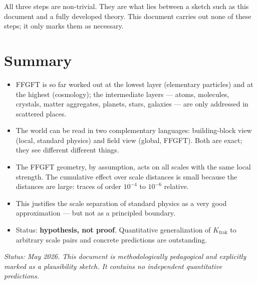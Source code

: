 All three steps are non-trivial. They are what lies between a
sketch such as this document and a fully developed theory. This
document carries out none of these steps; it only marks them as
necessary.

\section*{Summary}

\begin{itemize}\setlength\itemsep{2pt}
  \item FFGFT is so far worked out at the lowest layer (elementary
        particles) and at the highest (cosmology); the intermediate
        layers --- atoms, molecules, crystals, matter aggregates,
        planets, stars, galaxies --- are only addressed in scattered
        places.
  \item The world can be read in two complementary languages:
        building-block view (local, standard physics) and field view
        (global, FFGFT). Both are exact; they see different
        different things.
  \item The FFGFT geometry, by assumption, acts on all scales with
        the same local strength. The cumulative effect over scale
        distances is small because the distances are large: traces
        of order $10^{-4}$ to $10^{-6}$ relative.
  \item This justifies the scale separation of standard physics as
        a very good approximation --- but not as a principled
        boundary.
  \item Status: \textbf{hypothesis, not proof}. Quantitative
        generalization of $K_{\mathrm{frak}}$ to arbitrary scale
        pairs and concrete predictions are outstanding.
\end{itemize}

\medskip
\noindent\textit{Status: May 2026. This document is methodologically
pedagogical and explicitly marked as a plausibility sketch. It
contains no independent quantitative predictions.}
